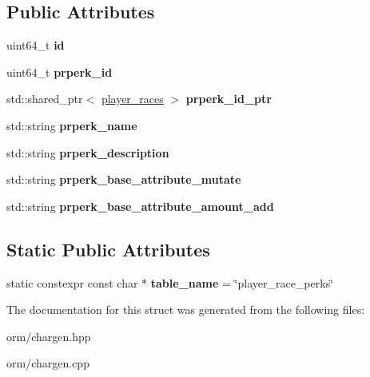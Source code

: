 \subsection*{Public Attributes}
\begin{DoxyCompactItemize}
\item 
\mbox{\label{structmods_1_1orm_1_1player__race__perks_a7578c825ea97d55a00f7f708dad5e438}} 
uint64\+\_\+t {\bfseries id}
\item 
\mbox{\label{structmods_1_1orm_1_1player__race__perks_a80c8512393fa488d54e6e178ddf75a0f}} 
uint64\+\_\+t {\bfseries prperk\+\_\+id}
\item 
\mbox{\label{structmods_1_1orm_1_1player__race__perks_ac72219e1b3c83c36af713ec35f02f1c0}} 
std\+::shared\+\_\+ptr$<$ \hyperlink{structmods_1_1orm_1_1player__races}{player\+\_\+races} $>$ {\bfseries prperk\+\_\+id\+\_\+ptr}
\item 
\mbox{\label{structmods_1_1orm_1_1player__race__perks_af1488d599578b61b06d329024f655390}} 
std\+::string {\bfseries prperk\+\_\+name}
\item 
\mbox{\label{structmods_1_1orm_1_1player__race__perks_ae42972af801fe1a85376806d078c989f}} 
std\+::string {\bfseries prperk\+\_\+description}
\item 
\mbox{\label{structmods_1_1orm_1_1player__race__perks_a541ab73c1ce44921aedfbb1a9cff38f8}} 
std\+::string {\bfseries prperk\+\_\+base\+\_\+attribute\+\_\+mutate}
\item 
\mbox{\label{structmods_1_1orm_1_1player__race__perks_a92e84352eb8dc931cb77002716b6e19c}} 
std\+::string {\bfseries prperk\+\_\+base\+\_\+attribute\+\_\+amount\+\_\+add}
\end{DoxyCompactItemize}
\subsection*{Static Public Attributes}
\begin{DoxyCompactItemize}
\item 
\mbox{\label{structmods_1_1orm_1_1player__race__perks_a2f5b93c596a139ec2069bf320075385f}} 
static constexpr const char $\ast$ {\bfseries table\+\_\+name} = \char`\"{}player\+\_\+race\+\_\+perks\char`\"{}
\end{DoxyCompactItemize}


The documentation for this struct was generated from the following files\+:\begin{DoxyCompactItemize}
\item 
orm/chargen.\+hpp\item 
orm/chargen.\+cpp\end{DoxyCompactItemize}
